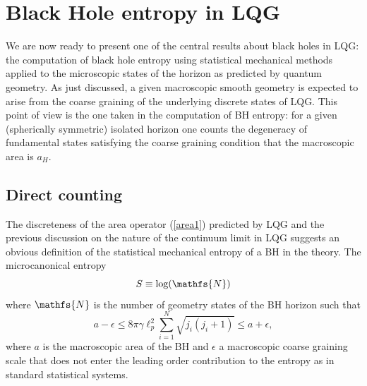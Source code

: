 \documentclass[aps, nofootinbib,superscriptaddress,12pt]{revtex4-2}
\def\be{\begin{equation}}
\def\ee{\end{equation}}
\newcommand{\mfs}[1]{\mathfs {#1}}                               %
\newcommand{\sN}{{\mfs N}}
\begin{document}
\section{Black Hole entropy in LQG}\label{BHE}

We are now ready to present one of the central results about black holes in LQG: the computation of black hole entropy using statistical mechanical  methods applied to the microscopic states of the horizon as predicted by quantum geometry.  
As just discussed, a given macroscopic smooth geometry is expected to arise from the coarse graining of the underlying discrete states of LQG. This point of view is the one taken in the computation of BH entropy: for a given (spherically symmetric) isolated horizon one counts the degeneracy of fundamental states satisfying the coarse graining condition that the macroscopic area is $a_H$. 

\subsection{Direct counting}\label{dirc}


The discreteness of the area operator (\ref{area1}) predicted by LQG and the previous discussion on the nature of the continuum limit in LQG suggests an obvious definition of the statistical mechanical entropy of a BH in the theory. The microcanonical entropy
\be
S\equiv \log(\sN)
\ee
where $\sN$ is the number of geometry states of the BH horizon such that 
\begin{equation}
 {a-\epsilon} \leq{8\pi\gamma\ell_p^2} \sum_{i=1}^N\sqrt{j_i(j_i+1)}\leq {a+\epsilon},\label{cond3}
\end{equation}
where $a$ is the macroscopic area of the BH and $\epsilon$ a macroscopic coarse graining scale that does not enter the leading order contribution to the entropy as in standard statistical systems.
\end{document}
